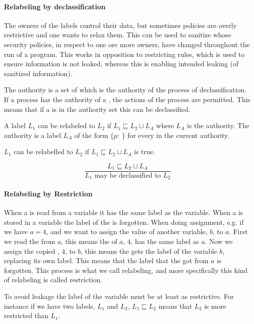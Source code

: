 \paragraph{Relabeling by declassification}
The owners of the labels control their data, but sometimes policies are overly restrictive and one wants to relax them.
This can be used to sanitize \xvalues{} whose security policies, in respect to one ore more owners, have changed throughout the run of a program.
This works in opposition to restricting rules, which is used to ensure information is not leaked, whereas this is enabling intended leaking (of sanitized information).

The authority is a set of \principals{} which is the authority of the process of declassification.
If a process has the authority of a \principal{}, the actions of the process are permitted.
This means that if a \principal{} is in the authority set this can be declassified.

A label $L_1$ can be relabeled to $L_2$ if $L_1 \sqsubseteq L_2 \sqcup L_A$ where $L_A$ is the authority.
The authority is a label $L_A$ of the form $\{p: \ \}$ for every \principal{} in the current authority.

$L_1$ can be relabelled to $L_2$ if $L_1 \sqsubseteq L_2 \sqcup L_A$ is true.
\begin{definition}
    $$\frac{L_1 \sqsubseteq L_2 \sqcup L_A}{L_1 \text{ may be declassified to } L_2}$$
\end{definition}

\paragraph{Relabeling by Restriction}
When a \xvalue{} is read from a variable it has the same label as the variable.
When a \xvalue{} is stored in a variable the label of the \xvalue{} is forgotten.
When doing assignment, e.g. if we have $a = 4$, and we want to assign the value of another variable, $b$, to $a$.
First we read the \xvalue{} from $a$, this means the \xvalue{} of $a$, $4$, has the same label as $a$.
Now we assign the copied \xvalue{}, $4$, to $b$, this means the \xvalue{} gets the label of the variable $b$, replacing its own label.
This means that the label that the \xvalue{} got from $a$ is forgotten.
This process is what we call relabeling, and more specifically this kind of relabeling is called restriction.

To avoid leakage the label of the variable must be at least as restrictive.
For instance if we have two labels, $L_1$ and $L_2$, $L_1 \sqsubseteq L_2$ means that $L_2$ is more restricted than $L_1$.

